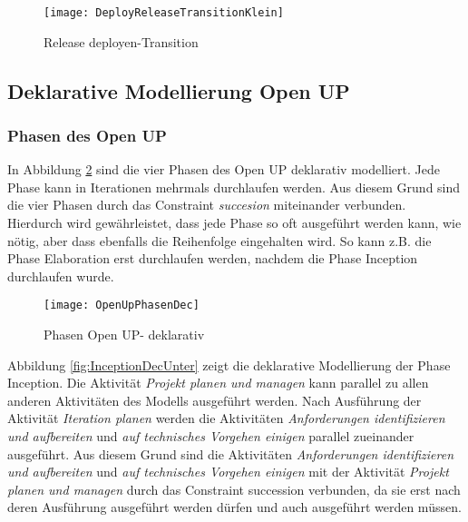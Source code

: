 \begin{figure}[!htbp]
\begin{center}
  \texttt{[image: DeployReleaseTransitionKlein]} %
  \caption{Release deployen-Transition}
  \label{fig:DeployReleaseTransitionKlein}
\end{center}
\end{figure}



\clearpage

\subsection{Deklarative Modellierung Open UP}




\subsubsection{Phasen des Open UP}


In Abbildung \ref{fig:OpenUpPhasenDec} sind die vier Phasen des Open UP deklarativ modelliert. Jede Phase kann in Iterationen mehrmals durchlaufen werden. Aus diesem Grund sind die vier Phasen durch das Constraint \textit{succesion} miteinander verbunden. Hierdurch wird gewährleistet, dass jede Phase so oft ausgeführt werden kann, wie nötig, aber dass ebenfalls die Reihenfolge eingehalten wird. So kann z.B. die Phase Elaboration erst durchlaufen werden, nachdem die Phase Inception durchlaufen wurde.
\begin{figure}[htp]
\begin{center}
  \texttt{[image: OpenUpPhasenDec]} %
  \caption{Phasen Open UP- deklarativ}
  \label{fig:OpenUpPhasenDec}
\end{center}
\end{figure}




Abbildung \ref{fig:InceptionDecUnter} zeigt die deklarative Modellierung der Phase Inception. Die Aktivität \textit{Projekt planen und managen} kann parallel zu allen anderen Aktivitäten des Modells ausgeführt werden.\newline
Nach Ausführung der Aktivität \textit{Iteration planen} werden die Aktivitäten \textit{Anforderungen identifizieren und aufbereiten} und \textit{auf technisches Vorgehen einigen} parallel zueinander ausgeführt. Aus diesem Grund sind die Aktivitäten \textit{Anforderungen identifizieren und aufbereiten} und \textit{auf technisches Vorgehen einigen} mit der Aktivität  \textit{Projekt planen und managen} durch das Constraint succession verbunden, da sie erst nach deren Ausführung ausgeführt werden dürfen und auch ausgeführt werden müssen. \newline

